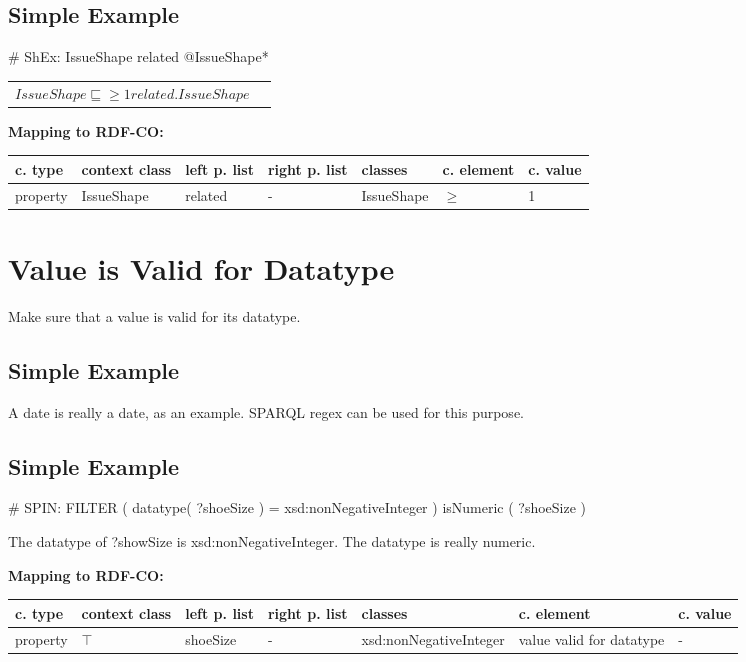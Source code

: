 \documentclass{llncs}
\newenvironment{gcotable}{
  \scriptsize
  \sffamily
  \vspace{0cm}
	\begin{center}
	\textbf{\vspace{0.4cm}Mapping to RDF-CO:} \\
  \begin{tabular}{l|l|l|l|l|l|l}
	\hline
  \textbf{c. type} & \textbf{context class} & \textbf{left p. list} & \textbf{right p. list} & \textbf{classes} & \textbf{c. element} & \textbf{c. value} \\
  \hline

}{
  \hline
  \end{tabular}
	\end{center}
}
\newenvironment{DL}{
  \vspace{0cm}
	\begin{center}
  \begin{tabular}{r l}

}{
  \end{tabular}
	\end{center}
}
\begin{document}
\subsection{Simple Example}

\begin{ex}
# ShEx:
IssueShape {
    related @IssueShape*
}
\end{ex}

\begin{DL}
$IssueShape \sqsubseteq \geq1 related.IssueShape $
\end{DL}

\begin{gcotable}
property & IssueShape & related & - & IssueShape & $\geq$ & 1 \\
\end{gcotable}

\section{Value is Valid for Datatype}

Make sure that a value is valid for its datatype.

\subsection{Simple Example}

A date is really a date, as an example.
SPARQL regex can be used for this purpose.

\subsection{Simple Example}

\begin{ex}
# SPIN:
FILTER ( datatype( ?shoeSize ) = xsd:nonNegativeInteger )
isNumeric ( ?shoeSize )
\end{ex}

The datatype of ?showSize is xsd:nonNegativeInteger.
The datatype is really numeric.

\begin{gcotable}
property & $\top$ & shoeSize & - & xsd:nonNegativeInteger & value valid for datatype & - \\
\end{gcotable}

%
%
\end{document}
